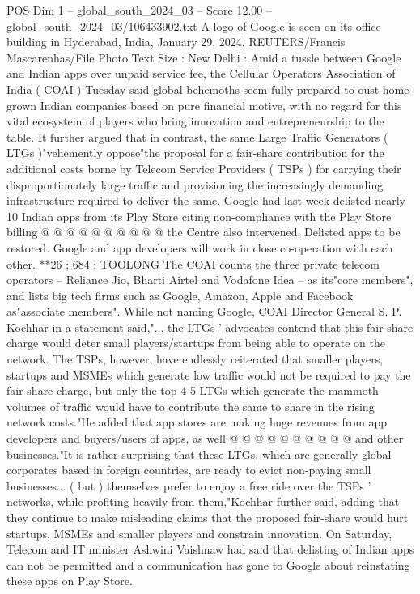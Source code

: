 \begin{textsample}{POS Dim 1 – global\_south\_2024\_03 – Score 12.00 – global\_south\_2024\_03/106433902.txt}
A logo of Google is seen on its office building in Hyderabad, India, January 29, 2024.
REUTERS/Francis Mascarenhas/File Photo Text Size : New Delhi : Amid a tussle between Google and Indian apps over unpaid service fee, the Cellular Operators Association of India ( COAI ) Tuesday said global behemoths seem fully prepared to oust home-grown Indian companies based on pure financial motive, with no regard for this vital ecosystem of players who bring innovation and entrepreneurship to the table.
It further argued that in contrast, the same Large Traffic Generators ( LTGs )"vehemently oppose"the proposal for a fair-share contribution for the additional costs borne by Telecom Service Providers ( TSPs ) for carrying their disproportionately large traffic and provisioning the increasingly demanding infrastructure required to deliver the same.
Google had last week delisted nearly 10 Indian apps from its Play Store citing non-compliance with the Play Store billing @ @ @ @ @ @ @ @ @ @ the Centre also intervened.
Delisted apps to be restored.
Google and app developers will work in close co-operation with each other. **26 ; 684 ; TOOLONG The COAI counts the three private telecom operators -- Reliance Jio, Bharti Airtel and Vodafone Idea -- as its"core members", and lists big tech firms such as Google, Amazon, Apple and Facebook as"associate members".
While not naming Google, COAI Director General S.
P.
Kochhar in a statement said,"... the LTGs ' advocates contend that this fair-share charge would deter small players/startups from being able to operate on the network.
The TSPs, however, have endlessly reiterated that smaller players, startups and MSMEs which generate low traffic would not be required to pay the fair-share charge, but only the top 4-5 LTGs which generate the mammoth volumes of traffic would have to contribute the same to share in the rising network costs."He added that app stores are making huge revenues from app developers and buyers/users of apps, as well @ @ @ @ @ @ @ @ @ @ and other businesses."It is rather surprising that these LTGs, which are generally global corporates based in foreign countries, are ready to evict non-paying small businesses... ( but ) themselves prefer to enjoy a free ride over the TSPs ' networks, while profiting heavily from them,"Kochhar further said, adding that they continue to make misleading claims that the proposed fair-share would hurt startups, MSMEs and smaller players and constrain innovation.
On Saturday, Telecom and IT minister Ashwini Vaishnaw had said that delisting of Indian apps can not be permitted and a communication has gone to Google about reinstating these apps on Play Store.

\end{textsample}
